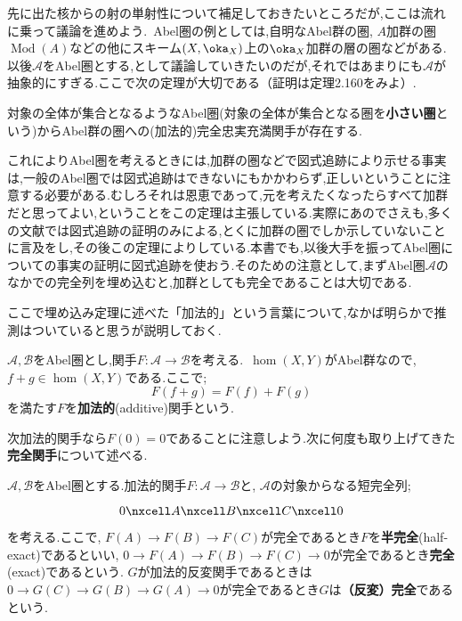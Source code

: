 先に出た核からの射の単射性について補足しておきたいところだが,ここは流れに乗って議論を進めよう.~Abel圏の例としては,自明なAbel群の圏, $A$加群の圏$\operatorname{Mod}(A)$などの他にスキーム$(X,\oka_X)$上の$\oka_X$加群の層の圏などがある.以後$\mathscr{A}$をAbel圏とする,として議論していきたいのだが,それではあまりにも$\mathscr{A}$が抽象的にすぎる.ここで次の定理が大切である（証明は\cite{siho}定理2.160をみよ）.

\begin{thm}\label{thm:埋め込み定理}
	対象の全体が集合となるようなAbel圏(対象の全体が集合となる圏を\textbf{小さい圏}という)からAbel群の圏への(加法的)完全忠実充満関手が存在する.
\end{thm}

これによりAbel圏を考えるときには,加群の圏などで図式追跡により示せる事実は,一般のAbel圏では図式追跡はできないにもかかわらず,正しいということに注意する必要がある.むしろそれは恩恵であって,元を考えたくなったらすべて加群だと思ってよい,ということをこの定理は主張している.実際にあの\cite{harts}でさえも,多くの文献では図式追跡の証明のみによる,とくに加群の圏でしか示していないことに言及をし,その後この定理によりしている.本書でも,以後大手を振ってAbel圏についての事実の証明に図式追跡を使おう.そのための注意として,まずAbel圏$\mathscr{A}$のなかでの完全列を埋め込むと,加群としても完全であることは大切である.

ここで埋め込み定理に述べた「加法的」という言葉について,なかば明らかで推測はついていると思うが説明しておく.
\begin{defi}[加法的関手]
	$\mathscr{A,B}$をAbel圏とし,関手$F:\mathscr{A}\to\mathscr{B}$を考える.~$\hom(X,Y)$がAbel群なので,~$f+g\in\hom(X,Y)$である.ここで;
	\[F(f+g)=F(f)+F(g)\]
	を満たす$F$を\textbf{加法的}(additive)関手という.
\end{defi}

次加法的関手なら$F(0)=0$であることに注意しよう.次に何度も取り上げてきた\textbf{完全関手}について述べる.

\begin{defi}[完全関手]
	$\mathscr{A,B}$をAbel圏とする.加法的関手$F:\mathscr{A}\to\mathscr{B}$と, $\mathscr{A}$の対象からなる短完全列;
	\[\begin{tikzcd}
		0\nxcell A\nxcell B\nxcell C\nxcell 0
	\end{tikzcd}\]
	を考える.ここで, $F(A)\to F(B)\to F(C)$が完全であるとき$F$を\textbf{半完全}(half-exact)であるといい, $0\to F(A)\to F(B)\to F(C)\to 0$が完全であるとき\textbf{完全}(exact)であるという. $G$が加法的反変関手であるときは$0\to G(C)\to G(B)\to G(A)\to0$が完全であるとき$G$は\textbf{（反変）完全}であるという. 
\end{defi}

